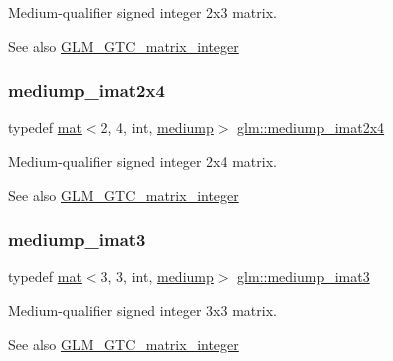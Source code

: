 Medium-\/qualifier signed integer 2x3 matrix. \begin{DoxySeeAlso}{See also}
\hyperlink{group__gtc__matrix__integer}{G\+L\+M\+\_\+\+G\+T\+C\+\_\+matrix\+\_\+integer} 
\end{DoxySeeAlso}
\mbox{\label{group__gtc__matrix__integer_gabc256c695f6fe794f809f2d1ee667d6e}} 
\subsubsection{\texorpdfstring{mediump\+\_\+imat2x4}{mediump\_imat2x4}}
{\footnotesize\ttfamily typedef \hyperlink{structglm_1_1mat}{mat}$<$2, 4, int, \hyperlink{namespaceglm_a36ed105b07c7746804d7fdc7cc90ff25a6416f3ea0c9025fb21ed50c4d6620482}{mediump}$>$ \hyperlink{group__gtc__matrix__integer_gabc256c695f6fe794f809f2d1ee667d6e}{glm\+::mediump\+\_\+imat2x4}}

Medium-\/qualifier signed integer 2x4 matrix. \begin{DoxySeeAlso}{See also}
\hyperlink{group__gtc__matrix__integer}{G\+L\+M\+\_\+\+G\+T\+C\+\_\+matrix\+\_\+integer} 
\end{DoxySeeAlso}
\mbox{\label{group__gtc__matrix__integer_gac6ab7a5cfe157ba8deb79a7691ad8263}} 
\subsubsection{\texorpdfstring{mediump\+\_\+imat3}{mediump\_imat3}}
{\footnotesize\ttfamily typedef \hyperlink{structglm_1_1mat}{mat}$<$3, 3, int, \hyperlink{namespaceglm_a36ed105b07c7746804d7fdc7cc90ff25a6416f3ea0c9025fb21ed50c4d6620482}{mediump}$>$ \hyperlink{group__gtc__matrix__integer_gac6ab7a5cfe157ba8deb79a7691ad8263}{glm\+::mediump\+\_\+imat3}}

Medium-\/qualifier signed integer 3x3 matrix. \begin{DoxySeeAlso}{See also}
\hyperlink{group__gtc__matrix__integer}{G\+L\+M\+\_\+\+G\+T\+C\+\_\+matrix\+\_\+integer} 
\end{DoxySeeAlso}
\mbox{\label{group__gtc__matrix__integer_gae3f0a14fb81eb2edc0caf5b131adb969}} 
